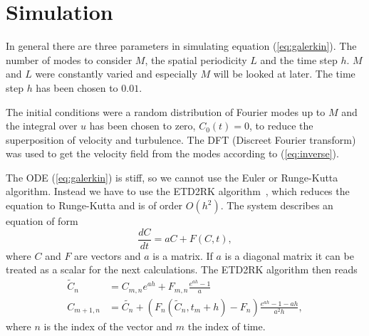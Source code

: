 \section{Simulation}
In general there are three parameters in simulating equation (\ref{eq:galerkin}). The number of modes to consider $M$, the spatial periodicity $L$ and the time step $h$. $M$ and $L$ were constantly varied and especially $M$ will be looked at later. The time step $h$ has been chosen to $0.01$.

The initial conditions were a random distribution of Fourier modes up to $M$ and the integral over $u$ has been chosen to zero, $C_0(t) = 0$, to reduce the superposition of velocity and turbulence. The DFT (Discreet Fourier transform) was used to get the velocity field from the modes according to (\ref{eq:inverse}).

The ODE (\ref{eq:galerkin}) is stiff, so we cannot use the Euler or Runge-Kutta algorithm. Instead we have to use the ETD2RK algorithm~\cite{cox2002exponential}, which reduces the equation to Runge-Kutta and is of order $O(h^2)$. The system describes an equation of form
\begin{equation}
  \frac{d C}{dt} = aC + F(C,t),
\end{equation}
where $C$ and $F$ are vectors and $a$ is a matrix. If $a$ is a diagonal matrix it can be treated as a scalar for the next calculations. The ETD2RK algorithm then reads
\begin{align}
  \tilde{C}_n & = C_{m,n} e^{ah} + F_{m,n} \frac{e^{ah} - 1}{a} \\
  C_{m + 1,n} & = \tilde{C_n} + \left(F_n(\tilde{C}_n, t_m + h) - F_n \right) \frac{e^{ah} - 1 - ah}{a^2 h},
\end{align}
where $n$ is the index of the vector and $m$ the index of time.

